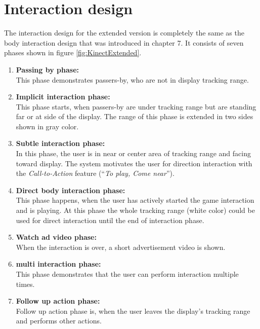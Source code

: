 \section{Interaction design}
The interaction design for the extended version is completely the same as the body interaction design that was introduced in chapter 7. It consists of seven phases shown in figure \ref{fig:KinectExtended}.

\begin{enumerate}
\item \textbf{Passing by phase:} \\
This phase demonstrates passers-by, who are not in display tracking range.

\item \textbf{Implicit interaction phase:} \\
This phase starts, when passers-by are under tracking range but are standing far or at side of the display. The range of this phase is extended in two sides shown in gray color.

\item \textbf{Subtle interaction phase:} \\
In this phase, the user is in near or center area of tracking range and facing toward display. The system motivates the user for direction interaction with the \emph{Call-to-Action} feature (``\emph{To play, Come near}'').

\item \textbf{Direct body interaction phase:} \\
This phase happens, when the user has actively started the game interaction and is playing. At this phase the whole tracking range (white color) could be used for direct interaction until the end of interaction phase.

\item \textbf{Watch ad video phase:} \\
When the interaction is over, a short advertisement video is shown.

\item \textbf{multi interaction phase:} \\
This phase demonstrates that the user can perform interaction multiple times.

\item \textbf{Follow up action phase:} \\
Follow up action phase is, when the user leaves the display’s tracking range and performs other actions.
\end{enumerate}


